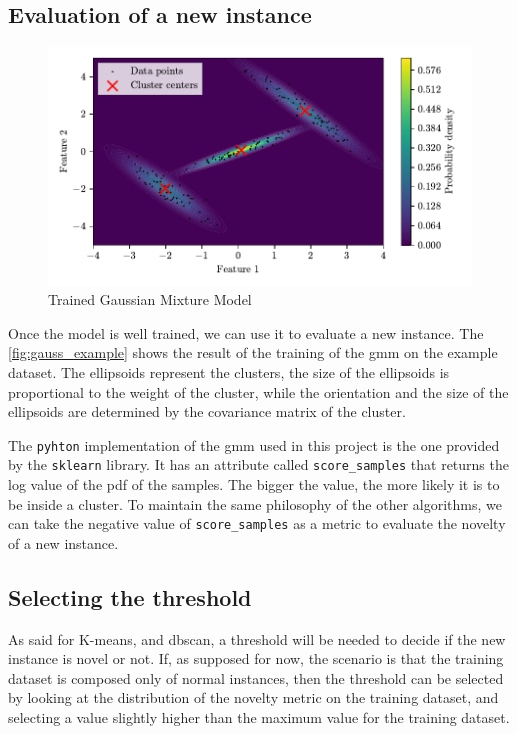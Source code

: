 \subsection{Evaluation of a new instance}
\begin{figure}[htbp]
    \centering
    \includegraphics{images/Gaussian/Figure_2.pdf}
    \caption{Trained Gaussian Mixture Model}
    \label{fig:gauss_example}
\end{figure}
Once the model is well trained, we can use it to evaluate a new instance. The \autoref{fig:gauss_example} shows the result of the training of the \gls{gmm} on the example dataset. The ellipsoids represent the clusters, the size of the ellipsoids is proportional to the weight of the cluster, while the orientation and the size of the ellipsoids are determined by the covariance matrix of the cluster. 

The \texttt{pyhton} implementation of the \gls{gmm} used in this project is the one provided by the \texttt{sklearn} library. It has an attribute called \texttt{score\_samples} that returns the log value of the \gls{pdf} of the samples.
The bigger the value, the more likely it is to be inside a cluster. 
To maintain the same philosophy of the other algorithms, we can take the negative value of \texttt{score\_samples} as a metric to evaluate the novelty of a new instance. 

\subsection{Selecting the threshold}
As said for K-means, and \gls{dbscan}, a threshold will be needed to decide if the new instance is novel or not. If, as supposed for now, the scenario is that the training dataset is composed only of normal instances, then the threshold can be selected by looking at the distribution of the novelty metric on the training dataset, and selecting a value slightly higher than the maximum value for the training dataset.

